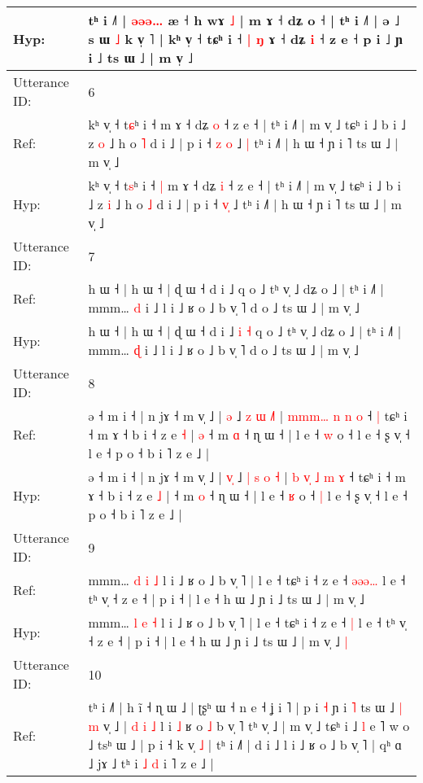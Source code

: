 \documentclass[10pt]{article}
\DeclareRobustCommand{\hl}[1]{{\textcolor{red}{#1}}}
\begin{document}
\begin{longtable}{ll}
 \\
Hyp: & tʰ i ˩˥ | \hl{ə}\hl{ə}\hl{ə}\hl{…} æ ˧\hl{} h wɤ \hl{˩} | m ɤ ˧ dʑ o ˧ | tʰ i ˩˥ | ə ˩ s ɯ \hl{˩} k v̩ ˥ | kʰ v̩ ˧ tɕʰ i ˧\hl{ }\hl{|} \hl{ŋ} ɤ ˧ dʑ \hl{i} ˧ z e ˧ p i ˩ ɲ i ˩ ts ɯ ˩ | m v̩ ˩
 \\
\midrule
Utterance ID: & 6 \\
Ref: & kʰ v̩ ˧ t\hl{ɕ}ʰ i ˧\hl{}\hl{} m ɤ ˧ dʑ \hl{o} ˧ z e ˧ | tʰ i ˩˥ | m v̩ ˩ tɕʰ i ˩ b i ˩ z \hl{o} ˩ h o \hl{˥} d i ˩ | p i ˧ \hl{z}\hl{ }\hl{o} ˩\hl{ }\hl{|} tʰ i ˩˥ | h ɯ ˧ ɲ i ˥ ts ɯ ˩ | m v̩ ˩
 \\
Hyp: & kʰ v̩ ˧ t\hl{s}ʰ i ˧\hl{ }\hl{|} m ɤ ˧ dʑ \hl{i} ˧ z e ˧ | tʰ i ˩˥ | m v̩ ˩ tɕʰ i ˩ b i ˩ z \hl{i} ˩ h o \hl{˩} d i ˩ | p i ˧ \hl{}\hl{v}\hl{̩} ˩\hl{}\hl{} tʰ i ˩˥ | h ɯ ˧ ɲ i ˥ ts ɯ ˩ | m v̩ ˩
 \\
\midrule
Utterance ID: & 7 \\
Ref: & h ɯ ˧ | h ɯ ˧ | ɖ ɯ ˧ d i ˩\hl{}\hl{}\hl{}\hl{} q o ˩ tʰ v̩ ˩ dʑ o ˩ | tʰ i ˩˥ | mmm… \hl{d} i ˩ l i ˩ ʁ o ˩ b v̩ ˥ d o ˩ ts ɯ ˩ | m v̩ ˩
 \\
Hyp: & h ɯ ˧ | h ɯ ˧ | ɖ ɯ ˧ d i ˩\hl{ }\hl{i}\hl{ }\hl{˧} q o ˩ tʰ v̩ ˩ dʑ o ˩ | tʰ i ˩˥ | mmm… \hl{ɖ} i ˩ l i ˩ ʁ o ˩ b v̩ ˥ d o ˩ ts ɯ ˩ | m v̩ ˩
 \\
\midrule
Utterance ID: & 8 \\
Ref: & ə ˧ m i ˧ | n jɤ ˧ m v̩ ˩ | \hl{}\hl{ə} ˩ \hl{z} \hl{ɯ} \hl{}\hl{˩}\hl{˥} | \hl{m}\hl{m}\hl{m}\hl{…} \hl{n} \hl{n} \hl{o} ˧\hl{ }\hl{|} tɕʰ i ˧ m ɤ ˧ b i ˧ z e \hl{˧} |\hl{ }\hl{ə} ˧ m \hl{ɑ} ˧ ɳ ɯ ˧ | l e ˧ \hl{w} o ˧\hl{}\hl{} l e ˧ ʂ v̩ ˧ l e ˧ p o ˧ b i ˥ z e ˩ |
 \\
Hyp: & ə ˧ m i ˧ | n jɤ ˧ m v̩ ˩ | \hl{v}\hl{̩} ˩ \hl{|} \hl{s} \hl{o}\hl{ }\hl{˧} | \hl{b}\hl{ }\hl{v}\hl{̩} \hl{˩} \hl{m} \hl{ɤ} ˧\hl{}\hl{} tɕʰ i ˧ m ɤ ˧ b i ˧ z e \hl{˩} |\hl{}\hl{} ˧ m \hl{o} ˧ ɳ ɯ ˧ | l e ˧ \hl{ʁ} o ˧\hl{ }\hl{|} l e ˧ ʂ v̩ ˧ l e ˧ p o ˧ b i ˥ z e ˩ |
 \\
\midrule
Utterance ID: & 9 \\
Ref: & mmm… \hl{d} \hl{i} \hl{˩} l i ˩ ʁ o ˩ b v̩ ˥ | l e ˧ tɕʰ i ˧ z e ˧ \hl{ə}\hl{ə}\hl{ə}\hl{…} l e ˧ tʰ v̩ ˧ z e ˧ | p i ˧ | l e ˧ h ɯ ˩ ɲ i ˩ ts ɯ ˩ | m v̩ ˩\hl{}\hl{}
 \\
Hyp: & mmm… \hl{l} \hl{e} \hl{˧} l i ˩ ʁ o ˩ b v̩ ˥ | l e ˧ tɕʰ i ˧ z e ˧ \hl{}\hl{}\hl{}\hl{|} l e ˧ tʰ v̩ ˧ z e ˧ | p i ˧ | l e ˧ h ɯ ˩ ɲ i ˩ ts ɯ ˩ | m v̩ ˩\hl{ }\hl{|}
 \\
\midrule
Utterance ID: & 10 \\
Ref: & tʰ i ˩˥ | h ĩ ˧ ɳ ɯ ˩ | ʈʂʰ ɯ ˧ n e ˧ ʝ i ˥ | p i \hl{˧} ɲ i \hl{˥} ts ɯ ˩\hl{ }\hl{|}\hl{ }\hl{m} v̩ ˩ | \hl{d} \hl{i} \hl{˩} l i \hl{˩} ʁ o \hl{˩} b v̩ ˥ tʰ v̩ ˩ | m v̩ ˩ tɕʰ i ˩ \hl{l} e ˥ w o ˩ tsʰ ɯ ˩\hl{}\hl{}\hl{}\hl{}\hl{}\hl{}\hl{}\hl{} |\hl{}\hl{}\hl{}\hl{} p i ˧ k v̩ \hl{}\hl{˩} | tʰ i ˩˥ | d i ˩ l i ˩ ʁ o ˩ b v̩ ˥ | qʰ ɑ ˩ jɤ ˩ tʰ i \hl{˩} \hl{d} i ˥ z e ˩ |

\end{longtable}
\end{document}
